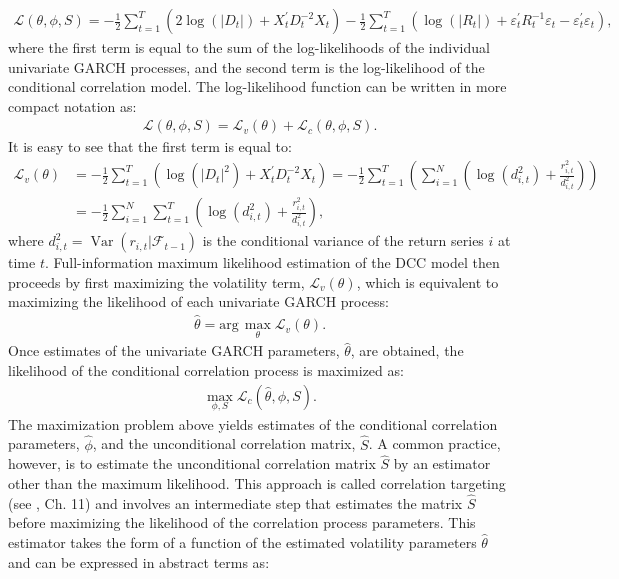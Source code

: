 \begin{align}
	\mathcal{L}(\theta, \phi, S) = - \frac{1}{2} \sum_{t=1}^T \left( 2\operatorname{log}(|D_t|) + X_t^\prime D_t^{-2}X_t \right) - \frac{1}{2} \sum_{t=1}^T \left( \operatorname{log}(|R_t|) + \varepsilon_{t}^\prime R_t^{-1}\varepsilon_{t} - \varepsilon_{t}^\prime \varepsilon_{t} \right),
\end{align}
where the first term is equal to the sum of the log-likelihoods of the individual univariate GARCH processes, and the second term is the log-likelihood of the conditional correlation model. The log-likelihood function can be written in more compact notation as:
\begin{align}
	\mathcal{L}(\theta, \phi, S) = \mathcal{L}_v(\theta) + \mathcal{L}_c(\theta,\phi,S).
\end{align}
It is easy to see that the first term is equal to:
\begin{align}
	\mathcal{L}_v(\theta) &= -\frac{1}{2} \sum_{t=1}^T \left( \operatorname{log}(|D_t|^2) + X_t^\prime D_t^{-2} X_t \right) = -\frac{1}{2} \sum_{t=1}^T \left( \sum_{i=1}^N \left( \operatorname{log}\left(d_{i,t}^2\right) + \frac{r_{i,t}^2}{d_{i,t}^2} \right) \right) \\
	&= - \frac{1}{2} \sum_{i=1}^N\sum_{t=1}^T \left( \operatorname{log}\left( d_{i,t}^2 \right) + \frac{r_{i,t}^2}{d_{i,t}^2} \right),
\end{align}
where $d_{i,t}^2 = \operatorname{Var}(r_{i,t}|\mathcal{F}_{t-1})$ is the conditional variance of the return series $i$ at time $t$. Full-information maximum likelihood estimation of the DCC model then proceeds by first maximizing the volatility term, $\mathcal{L}_v(\theta)$, which is equivalent to maximizing the likelihood of each univariate GARCH process:
\begin{align}
	\widehat{\theta} = \text{arg}\, \max_{\theta}{\mathcal{L}_v(\theta)}.
\end{align}
Once estimates of the univariate GARCH parameters, $\widehat{\theta}$, are obtained, the likelihood of the conditional correlation process is maximized as:
\begin{align}
	\max_{\phi, S}{\mathcal{L}_c(\widehat{\theta},\phi,S)}.
\end{align}
The maximization problem above yields estimates of the conditional correlation parameters, $\widehat{\phi}$, and the unconditional correlation matrix, $\widehat{S}$. A common practice, however, is to estimate the unconditional correlation matrix $\widehat{S}$ by an estimator other than the maximum likelihood. This approach is called correlation targeting (see \textcite{ENGLE2009}, Ch. 11) and involves an intermediate step that estimates the matrix $\widehat{S}$ before maximizing the likelihood of the correlation process parameters. This estimator takes the form of a function of the estimated volatility parameters $\widehat{\theta}$ and can be expressed in abstract terms as:

